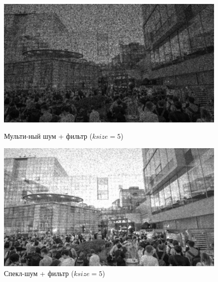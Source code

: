 \documentclass[a4paper]{article}
\begin{document}
\begin{figure}[H]
    \begin{minipage}{0.49\textwidth}
        \centering \includegraphics[width=\textwidth]{images/3_nonlinear_filters/multiplicative - median (ksize=5).jpg}
        \caption{Мульти-ный шум + фильтр ($ksize = 5$)}
    \end{minipage}\hfill
    \begin{minipage}{0.49\textwidth}
        \centering \includegraphics[width=\textwidth]{images/3_nonlinear_filters/speckle - median (ksize=5).jpg}
        \caption{Спекл-шум + фильтр ($ksize = 5$)}
    \end{minipage}
\end{figure}
\end{document}
